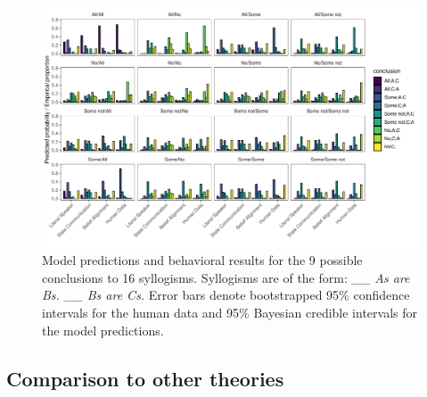 \documentclass[floatsintext, doc]{apa6}
\newcommand{\datafoldername}{csv_to_tex}
\newcommand{\rlgetvalue}[4]{\csvreader[filter strcmp={\mykey}{#3},
             late after line = {{,}\ }, late after last line = {{}}]
            {\datafoldername/#1}{#2=\mykey,#4=\myvalue}{\myvalue}}
\begin{document}
\begin{figure}[t]
\centering
\includegraphics[width = \textwidth]{figs/bda_rsa_bars.pdf}
\caption{Model predictions and behavioral results for the 9 possible conclusions to 16 syllogisms. Syllogisms are of the form: \emph{\_\_ As are Bs. \_\_ Bs are Cs.} Error bars denote bootstrapped 95\% confidence intervals for the human data and 95\% Bayesian credible intervals for the model predictions.}
\label{fig:bars}
\end{figure}





%
%   
%
%


            


\subsection{Comparison to other theories}
\end{document}
